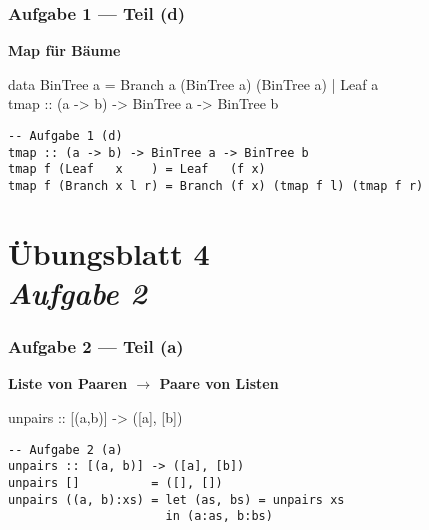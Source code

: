 \documentclass{beamer}
\begin{document}
\begin{frame}[fragile, t] \frametitle{Aufgabe 1 --- Teil (d)}
	\textbf{Map für Bäume}
	
	\begin{ttfamily}
		{\small data BinTree a = Branch a (BinTree a) (BinTree a) | Leaf a} \\
		tmap :: (a -> b) -> BinTree a -> BinTree b
	\end{ttfamily}
	
	\bigskip \pause
	
	\begin{lstlisting}
-- Aufgabe 1 (d)
tmap :: (a -> b) -> BinTree a -> BinTree b
tmap f (Leaf   x    ) = Leaf   (f x)
tmap f (Branch x l r) = Branch (f x) (tmap f l) (tmap f r)
	\end{lstlisting}
\end{frame}

\section{Übungsblatt 4 \\ \textit{\normalsize Aufgabe 2}}

\begin{frame}[fragile, t] \frametitle{Aufgabe 2 --- Teil (a)}
	\textbf{Liste von Paaren $\to$ Paare von Listen}
	
	\begin{ttfamily}
		unpairs :: [(a,b)] -> ([a], [b])
	\end{ttfamily}
	
	\bigskip \pause
	
	\begin{lstlisting}
-- Aufgabe 2 (a)
unpairs :: [(a, b)] -> ([a], [b])
unpairs []          = ([], [])
unpairs ((a, b):xs) = let (as, bs) = unpairs xs
                      in (a:as, b:bs)
	\end{lstlisting}
\end{frame}
\end{document}
